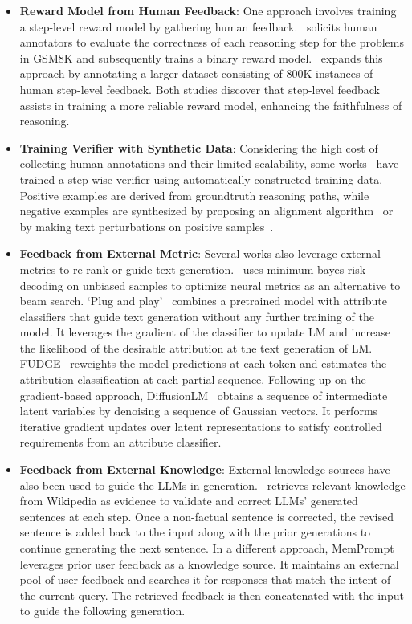 \documentclass[a4paper,oneside]{book}
\begin{document}
\begin{itemize}
    \item \textbf{Reward Model from Human Feedback}: One approach involves training a step-level reward model by gathering human feedback.~\cite{uesato2022solving} solicits human annotators to evaluate the correctness of each reasoning step for the problems in GSM8K and subsequently trains a binary reward model.~\cite{lightman2023lets} expands this approach by annotating a larger dataset consisting of 800K instances of human step-level feedback. Both studies discover that step-level feedback assists in training a more reliable reward model, enhancing the faithfulness of reasoning.

    \item \textbf{Training Verifier with Synthetic Data}: Considering the high cost of collecting human annotations and their limited scalability, some works~\cite{yang-etal-2022-generating, tafjord-etal-2022-entailer, li-etal-2023-making, khalifa2023grace} have trained a step-wise verifier using automatically constructed training data. Positive examples are derived from groundtruth reasoning paths, while negative examples are synthesized by proposing an alignment algorithm~\cite{khalifa2023grace} or by making text perturbations on positive samples~\cite{yang-etal-2022-generating}.

    \item \textbf{Feedback from External Metric}: Several works also leverage external metrics to re-rank or guide text generation.~\cite{freitag-etal-2022-high} uses minimum bayes risk decoding on unbiased samples to optimize neural metrics as an alternative to beam search. `Plug and play'~\cite{dathathri2020plug} combines a pretrained model with attribute classifiers that guide text generation without any further training of the model. It leverages the gradient of the classifier to update LM and increase the likelihood of the desirable attribution at the text generation of LM. FUDGE~\cite{yang-klein-2021-fudge} reweights the model predictions at each token and estimates the attribution classification at each partial sequence. Following up on the gradient-based approach, DiffusionLM~\cite{li2022diffusionlm} obtains a sequence of intermediate latent variables by denoising a sequence of Gaussian vectors. It performs iterative gradient updates over latent representations to satisfy controlled requirements from an attribute classifier.

    \item \textbf{Feedback from External Knowledge}: External knowledge sources have also been used to guide the LLMs in generation.~\cite{varshney2023stitch} retrieves relevant knowledge from Wikipedia as evidence to validate and correct LLMs' generated sentences at each step. Once a non-factual sentence is corrected, the revised sentence is added back to the input along with the prior generations to continue generating the next sentence. In a different approach, MemPrompt~\cite{madaan-etal-2022-memory} leverages prior user feedback as a knowledge source. It maintains an external pool of user feedback and searches it for responses that match the intent of the current query. The retrieved feedback is then concatenated with the input to guide the following generation.


\end{itemize}
\end{document}
